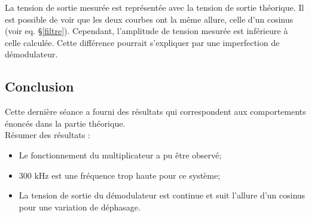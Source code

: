 La tension de sortie mesurée est représentée avec la tension de sortie théorique. Il est possible
de voir que les deux courbes ont la même allure, celle d'un cosinus (voir eq. §\ref{filtre}). Cependant, l'amplitude de 
tension mesurée est inférieure à celle calculée. Cette différence pourrait s'expliquer par une 
imperfection de démodulateur.

\subsection{Conclusion}

Cette dernière séance a fourni des résultats qui correspondent aux comportements énoncés dans la 
partie théorique.\\

Résumer des résultats :

\begin{itemize}
    \item Le fonctionnement du multiplicateur a pu être observé;
    \item 300 kHz est une fréquence trop haute pour ce système;
    \item La tension de sortie du démodulateur est continue et suit l'allure d'un cosinus pour une 
    variation de déphasage.
\end{itemize}

\newpage